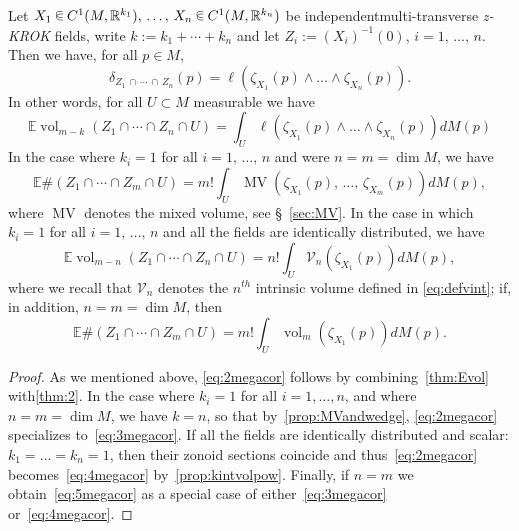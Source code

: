 \documentclass[AHL, Unicode, longabstracts, published]{cedram}
\newcommand{\R}{\mathbb{R}}
\newcommand{\EE}{\mathbb{E}}
\DeclareMathOperator{\vol}{vol}
\DeclareMathOperator{\MV}{MV}
\newcommand{\Vint}{\mathcal{V}}
\newcommand{\zkrok}{\emph{z-KROK}\xspace}
\newcommand*\randin{
\mathchoice {\raisebox{-.35ex}{$\displaystyle{^\subset}$}\mkern-11.5mu\raisebox{+.45ex}{$\displaystyle{_\subset}$}} {\mkern+1mu\raisebox{-.27ex}{$\textstyle{^\subset}$}\mkern-11.7mu\raisebox{+.45ex}{$\textstyle{_\subset}$}} {\raisebox{.35ex}{$\scriptstyle\subset$}\mkern-14mu\raisebox{-.15ex}{$\scriptstyle\subset$}} {\raisebox{.3ex}{$\scriptscriptstyle\subset$}\mkern-13.5mu\raisebox{-.10ex}{$\scriptscriptstyle\subset$}}}
\begin{document}
\begin{coro}\label{cor:Evolvol}
Let $X_1\,\randin\, C^1(M,\R^{k_1}),\,\ldots,\,X_n\,\randin\, C^1(M,\R^{k_n})$ be independent\linebreak multi-transverse \zkrok fields, write $k:=k_1+\cdots+k_n$ and let $Z_i:=(X_i)^{-1}(0)$, $i=1,\,\ldots,\,n$. Then we have, for all $p\in M$,
\begin{equation}\label{eq:1megacor}
\delta_{Z_1\,\cap\,\cdots\,\cap\,Z_n}(p)=\ell(\zeta_{X_1}(p)\wedge\ldots\wedge \zeta_{X_n}(p)).
\end{equation}
In other words, for all $U\subset M$ measurable we have
\begin{equation}\label{eq:2megacor}
\EE\vol_{m-k}\left(Z_1\cap\cdots\cap Z_n\cap U\right)=\int_U \ell(\zeta_{X_1}(p)\wedge\ldots \wedge\zeta_{X_n}(p)) dM (p)
\end{equation} In the case where $k_i=1$ for all $i=1,\,\dots,\,n$ and were $n=m=\dim M$, we have
\begin{equation}\label{eq:3megacor}
\EE\#\left(Z_1\cap\cdots\cap Z_m\cap U\right)=m!\int_U \MV(\zeta_{X_1}(p),\,\ldots,\,\zeta_{X_m}(p)) dM (p),
\end{equation}
where $\MV$ denotes the mixed volume, see \S~\ref{sec:MV}. In the case in which $k_i=1$ for all $i=1,\,\dots,\,n$ and all the fields are identically distributed, we have
\begin{equation}\label{eq:4megacor}
\EE\vol_{m-n}\left(Z_1\cap\cdots\cap Z_n\cap U\right)=n!\int_U \Vint_n(\zeta_{X_1}(p)) dM (p),
\end{equation}
where we recall that $\Vint_n$ denotes the $n^{th}$ intrinsic volume defined in \eqref{eq:defvint}; if, in addition, $n=m=\dim M$, then
\begin{equation}\label{eq:5megacor}
\EE\#\left(Z_1\cap\cdots\cap Z_m\cap U\right)=m!\int_U \vol_m(\zeta_{X_1}(p)) dM (p).
\end{equation}
\end{coro}

\begin{proof}
As we mentioned above, \eqref{eq:2megacor} follows by combining~\cref{thm:Evol} with\linebreak \cref{thm:2}. In the case where $k_i=1$ for all $i=1,\ldots,n$, and where $n=m=\dim M$, we have $k=n$, so that by~\cref{prop:MVandwedge}, \eqref{eq:2megacor} specializes to~\eqref{eq:3megacor}. If all the fields are identically distributed and scalar: $k_1=\dots=k_n=1$, then their zonoid sections coincide and thus~\eqref{eq:2megacor} becomes~\eqref{eq:4megacor} by~\cref{prop:kintvolpow}. Finally, if $n=m$ we obtain~\eqref{eq:5megacor} as a special case of either~\eqref{eq:3megacor} or~\eqref{eq:4megacor}.
\end{proof}
\end{document}
